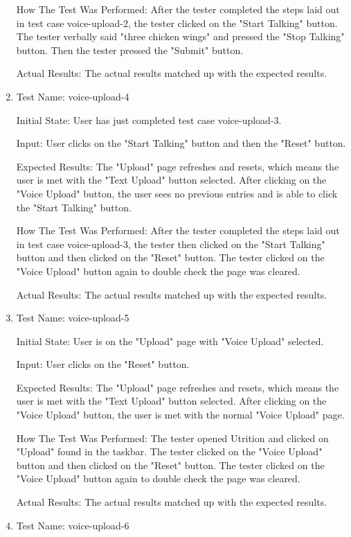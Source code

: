 \documentclass[12pt, titlepage]{article}
\begin{document}
\begin{enumerate}
		How The Test Was Performed: After the tester completed the steps laid out in test case voice-upload-2, the tester clicked on the "Start Talking" button. The tester verbally said "three chicken wings" and pressed the "Stop Talking" button. Then the tester pressed the "Submit" button.
		
		Actual Results: The actual results matched up with the expected results.
		
		\item{Test Name: voice-upload-4}
		
		Initial State: User has just completed test case voice-upload-3.
		
		Input: User clicks on the "Start Talking" button and then the "Reset" button.
		
		Expected Results: The "Upload" page refreshes and resets, which means the user is met with the "Text Upload" button selected. After clicking on the "Voice Upload" button, the user sees no previous entries and is able to click the "Start Talking" button.
		
		How The Test Was Performed: After the tester completed the steps laid out in test case voice-upload-3, the tester then clicked on the "Start Talking" button and then clicked on the "Reset" button. The tester clicked on the "Voice Upload" button again to double check the page was cleared.
		
		Actual Results: The actual results matched up with the expected results.
		
		\item{Test Name: voice-upload-5}
		
		Initial State: User is on the "Upload" page with "Voice Upload" selected.
		
		Input: User clicks on the "Reset" button.
		
		Expected Results: The "Upload" page refreshes and resets, which means the user is met with the "Text Upload" button selected. After clicking on the "Voice Upload" button, the user is met with the normal "Voice Upload" page.
		
		How The Test Was Performed: The tester opened Utrition and clicked on "Upload" found in the taskbar. The tester clicked on the "Voice Upload" button and then clicked on the "Reset" button. The tester clicked on the "Voice Upload" button again to double check the page was cleared. 
		
		Actual Results: The actual results matched up with the expected results.
		
		\item{Test Name: voice-upload-6}
		

\end{enumerate}
\end{document}
